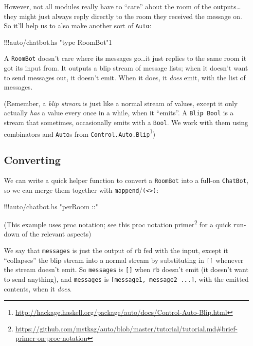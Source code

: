\documentclass[]{article}
\newenvironment{Shaded}{}{}
\newcommand{\DecValTok}[1]{\textcolor[rgb]{0.25,0.63,0.44}{{#1}}}
\newcommand{\StringTok}[1]{\textcolor[rgb]{0.25,0.44,0.63}{{#1}}}
\newcommand{\FunctionTok}[1]{\textcolor[rgb]{0.02,0.16,0.49}{{#1}}}
\newcommand{\NormalTok}[1]{{#1}}
\renewcommand{\href}[2]{#2\footnote{\url{#1}}}
\begin{document}
However, not all modules really have to ``care'' about the room of the
outputs\ldots{}they might just always reply directly to the room they
received the message on. So it'll help us to also make another sort of
\texttt{Auto}:

\begin{Shaded}
\begin{Highlighting}[]
\FunctionTok{!!!}\NormalTok{auto}\FunctionTok{/}\NormalTok{chatbot}\FunctionTok{.}\NormalTok{hs }\StringTok{"type RoomBot"}\DecValTok{1}
\end{Highlighting}
\end{Shaded}

A \texttt{RoomBot} doesn't care where its messages go\ldots{}it just
replies to the same room it got its input from. It outputs a blip stream
of message lists; when it doesn't want to send messages out, it doesn't
emit. When it does, it \emph{does} emit, with the list of messages.

(Remember, a \emph{blip stream} is just like a normal stream of values,
except it only actually \emph{has} a value every once in a while, when
it ``emits''. A \texttt{Blip\ Bool} is a stream that sometimes,
occasionally emits with a \texttt{Bool}. We work with them using
combinators and \texttt{Auto}s from
\href{http://hackage.haskell.org/package/auto/docs/Control-Auto-Blip.html}{\texttt{Control.Auto.Blip}})

\subsection{Converting}\label{converting}

We can write a quick helper function to convert a \texttt{RoomBot} into
a full-on \texttt{ChatBot}, so we can merge them together with
\texttt{mappend}/\texttt{(\textless{}\textgreater{})}:

\begin{Shaded}
\begin{Highlighting}[]
\FunctionTok{!!!}\NormalTok{auto}\FunctionTok{/}\NormalTok{chatbot}\FunctionTok{.}\NormalTok{hs }\StringTok{"perRoom ::"}
\end{Highlighting}
\end{Shaded}

(This example uses proc notation; see this
\href{https://github.com/mstksg/auto/blob/master/tutorial/tutorial.md\#brief-primer-on-proc-notation}{proc
notation primer} for a quick run-down of the relevant aspects)

We say that \texttt{messages} is just the output of \texttt{rb} fed with
the input, except it ``collapses'' the blip stream into a normal stream
by substituting in \texttt{{[}{]}} whenever the stream doesn't emit. So
\texttt{messages} is \texttt{{[}{]}} when \texttt{rb} doesn't emit (it
doesn't want to send anything), and \texttt{messages} is
\texttt{{[}message1,\ message2\ ...{]}}, with the emitted contents, when
it \emph{does}.
\end{document}
